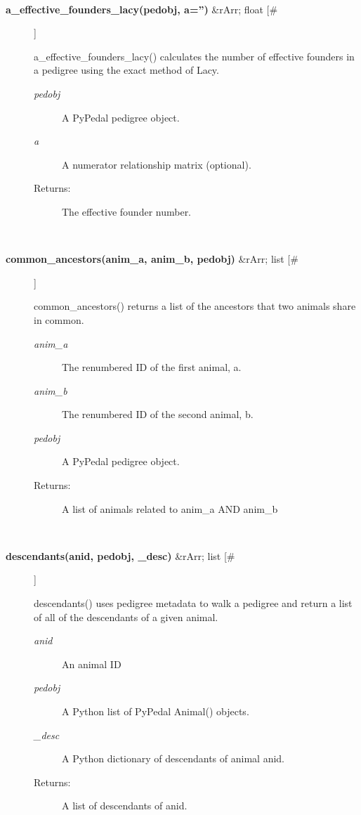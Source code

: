 \documentclass[10pt]{article}
\begin{document}
\begin{description}
\begin{description}
\end{description}
\\ 

\item[\textbf{a\_effective\_founders\_lacy(pedobj, a='')}
 \&rArr; float [\#]]

 a\_effective\_founders\_lacy() calculates the number of effective founders in a pedigree using the exact method of Lacy.
\begin{description}
\item[\emph{pedobj}
] A PyPedal pedigree object.
\item[\emph{a}
] A numerator relationship matrix (optional).
\item[Returns:] The effective founder number.

\end{description}
\\ 

\item[\textbf{common\_ancestors(anim\_a, anim\_b, pedobj)}
 \&rArr; list [\#]]

 common\_ancestors() returns a list of the ancestors that two animals share in common.
\begin{description}
\item[\emph{anim\_a}
] The renumbered ID of the first animal, a.
\item[\emph{anim\_b}
] The renumbered ID of the second animal, b.
\item[\emph{pedobj}
] A PyPedal pedigree object.
\item[Returns:] A list of animals related to anim\_a AND anim\_b

\end{description}
\\ 

\item[\textbf{descendants(anid, pedobj, \_desc)}
 \&rArr; list [\#]]

 descendants() uses pedigree metadata to walk a pedigree and return a list of all of the descendants of a given animal.
\begin{description}
\item[\emph{anid}
] An animal ID
\item[\emph{pedobj}
] A Python list of PyPedal Animal() objects.
\item[\emph{\_desc}
] A Python dictionary of descendants of animal anid.
\item[Returns:] A list of descendants of anid.

\end{description}
\\ 


\end{description}
\end{document}
